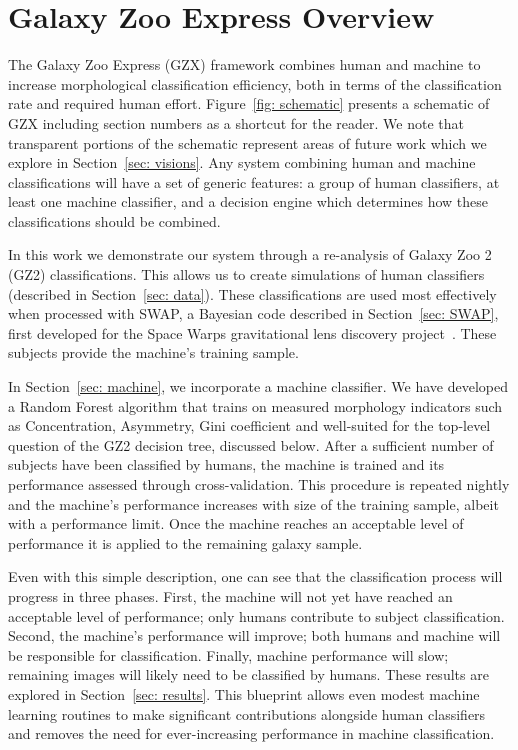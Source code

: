 \section{Galaxy Zoo Express Overview}

The Galaxy Zoo Express (GZX) framework combines human and machine to
 increase morphological classification efficiency, both in terms of the classification rate 
and required human effort. Figure~\ref{fig: schematic} presents a schematic of 
GZX including section numbers as a shortcut for the reader. We note that transparent 
portions  of the schematic represent areas of future work which we explore in 
Section~\ref{sec: visions}. Any system combining human and machine classifications 
will have a set of generic features: a group of human classifiers, at least one 
machine classifier, and a decision engine which determines how these 
classifications should be combined.

In this work we demonstrate our system through a re-analysis of  Galaxy Zoo 2 (GZ2)
 classifications. This allows us to  create simulations of human classifiers (described in
 Section~\ref{sec: data}). These classifications are used most effectively when processed 
with SWAP, a Bayesian code described in Section~\ref{sec: SWAP}, first developed 
for the Space Warps gravitational lens discovery project~\citep{Marshall2016}. 
These subjects provide the machine's training sample. 

In Section~\ref{sec: machine}, we incorporate a machine classifier. We have 
developed a Random Forest algorithm that trains on measured morphology 
indicators such as Concentration, Asymmetry, Gini coefficient and 
 well-suited for the top-level question of the GZ2 decision tree, 
discussed below. After a sufficient number of subjects have been classified 
by humans,  the machine is trained and its performance assessed through 
cross-validation. This procedure is repeated nightly and the machine's performance 
increases with size of the training sample, albeit with a performance limit. 
Once the machine reaches an acceptable level of performance it is applied to the 
remaining galaxy sample. 

Even with this simple description, one can see that the classification process 
will progress in three phases.  First, the machine will not yet have reached an 
acceptable level of performance; only humans contribute to subject classification. 
Second, the machine's performance will improve; both humans and machine will 
be responsible for classification. Finally, machine performance will slow; 
remaining images will likely need to be classified by humans. These results are 
explored in  Section~\ref{sec: results}. This blueprint allows even modest 
machine learning routines to make significant contributions alongside human 
classifiers and removes the need for ever-increasing performance in machine classification.





